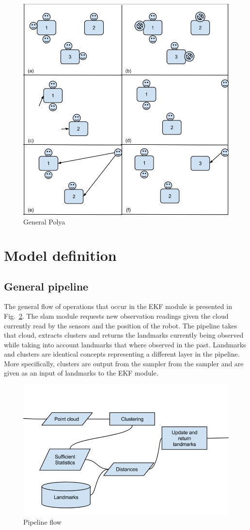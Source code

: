\documentclass[]{article}
\begin{document}
\begin{figure}
    \includegraphics[width=0.9\linewidth]{generalPolya}
    \caption{General Polya}
    \label{generalPolya}
\end{figure}


\section{Model definition}
\label{sec:model}

\subsection{General pipeline}

The general flow of operations that occur in the EKF module is presented in Fig.~\ref{pipeline}. The slam module requests new observation readings given the cloud currently read by the sensors and the position of the robot. The pipeline takes that cloud, extracts clusters and returns the landmarks currently being observed while taking into account landmarks that where observed in the past. Landmarks and clusters are identical concepts representing a different layer in the pipeline. More specifically, clusters are output from the sampler from the sampler and are given as an input of landmarks to the EKF module.

\begin{figure}
    \centering
    \includegraphics[width=.4\textwidth]{workflowSpec}
    \caption{Pipeline flow}
    \label{pipeline}
\end{figure}
\end{document}
